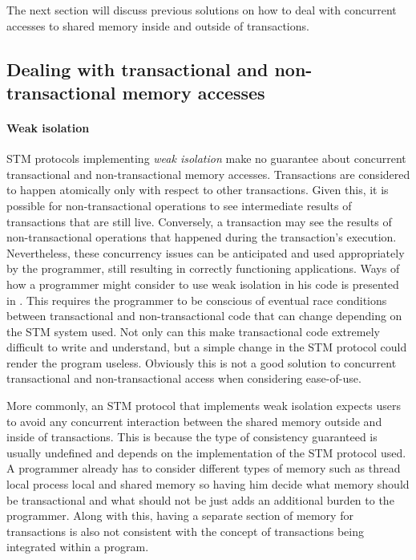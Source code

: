 The next section will discuss previous solutions on how to deal
with concurrent accesses to shared memory inside and outside of transactions.

\subsection{Dealing with transactional and non-transactional memory accesses}
\label{sec:SIsolutions}

\paragraph{Weak isolation}
STM protocols implementing \emph{weak isolation} make no guarantee
about concurrent transactional and non-transactional memory accesses.
Transactions are considered to  
happen atomically only with respect to other transactions.  Given this, it is possible
for non-transactional operations to see intermediate results  
of transactions that are still  live. Conversely, a transaction may see the
results of non-transactional operations that happened during  
the  transaction{}'s   execution.
Nevertheless, these concurrency issues can be anticipated and used
appropriately by the 
programmer,  still resulting  in correctly  functioning  applications.
Ways of how a programmer might consider to use weak isolation in his code
is presented in \cite{blundell06}.
This requires the programmer 
to  be conscious  of  eventual race  conditions  between transactional  and
non-transactional code that can change depending on the STM system used.
Not only can this make transactional code extremely difficult to write
and understand, but a simple change in the STM protocol could render the
program useless.
Obviously this is not a good solution to concurrent transactional and non-transactional
access when considering ease-of-use.

More commonly, an STM protocol that implements weak isolation expects users to avoid
any concurrent interaction between the shared memory outside and inside of
transactions.
This is because the type of consistency guaranteed is usually undefined
and depends on the implementation of the STM protocol used.
A programmer already has to consider different types of memory such as thread local
process local and shared memory so having him decide what memory should be transactional
and what should not be just adds an additional burden to the programmer.
Along with this, having a separate section of memory for transactions is also not consistent with
the concept of transactions being integrated within a program.

